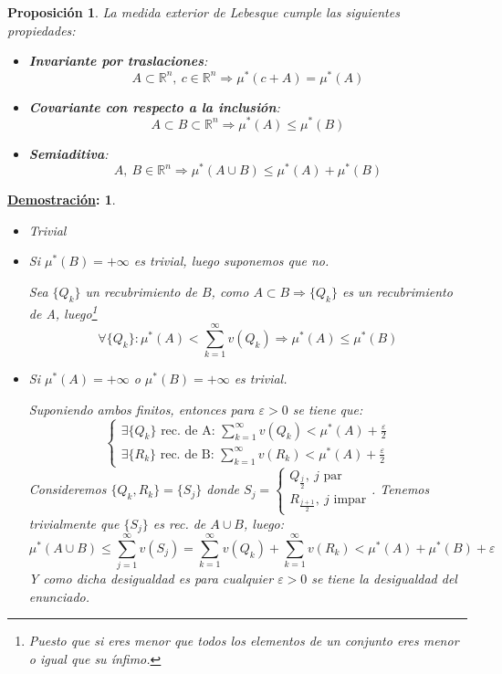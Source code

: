 \documentclass[10pt,a4paper,openright]{book}
\theoremstyle{break}
\newtheorem*{prop}{Proposición}
\newtheorem*{demo}{\underline{Demostración}:}
\begin{document}
\begin{prop}
La medida exterior de Lebesque cumple las siguientes propiedades:
\begin{itemize}
\item \textbf{Invariante por traslaciones}:
$$A \subset \mathbb{R}^{n}, \ c \in \mathbb{R}^{n} \Rightarrow \mu^{*}\left( c + A \right) = \mu^{*}\left( A \right) $$ 
\item \textbf{Covariante con respecto a la inclusión}:
$$A \subset B \subset \mathbb{R}^{n} \Rightarrow \mu^{*}\left( A \right) \le \mu^{*}\left( B \right) $$
\item \textbf{Semiaditiva}:
$$A,\ B \in \mathbb{R}^{n} \Rightarrow \mu^{*}\left( A \cup B \right) \le \mu^{*}\left( A \right) + \mu^{*}\left( B \right)$$
\end{itemize}
\end{prop}
\begin{demo}
\begin{itemize}
\item Trivial

\item Si $\mu^{*}\left( B \right) = +\infty$ es trivial, luego suponemos que no.

Sea $\{Q_k\}$ un recubrimiento de $B$, como $A \subset B \Rightarrow \{Q_k\}$ es un recubrimiento de A, luego\footnote{Puesto que si eres menor que todos los elementos de un conjunto eres menor o igual que su ínfimo.}
$$\forall \{Q_k\}: \mu^{*}\left( A \right) < \sum_{k=1}^{\infty} v\left( Q_k \right) \Rightarrow \mu^{*}\left( A \right) \le \mu^{*}\left( B \right) $$

\item Si $\mu^{*}\left( A \right) = +\infty$ o $\mu^{*}\left( B \right) = +\infty$ es trivial. 
 
Suponiendo ambos finitos, entonces para $\varepsilon > 0$ se tiene que:
$$\begin{cases}
\exists \{Q_k\} \text{ rec. de A: } \sum_{k=1}^{\infty} v\left( Q_k \right) < \mu^{*}\left( A \right) + \frac{\varepsilon}{2}  \\
\exists \{R_k\} \text{ rec. de B: } \sum_{k=1}^{\infty} v\left( R_k \right) < \mu^{*}\left( A \right) + \frac{\varepsilon}{2} 
\end{cases}
$$
Consideremos $ \{Q_k, R_k\} = \{S_j\}$ donde $S_j = \begin{cases}
Q_{\frac{j}{2}},\ j \text{ par} \\
R_{\frac{j+1}{2}},\ j \text{ impar} 
\end{cases}$. Tenemos trivialmente que $\{S_j\}$ es rec. de $A\cup B$, luego:
$$\mu^{*}\left( A\cup B \right) \le \sum_{j=1}^{\infty} v\left( S_j \right) = \sum_{k=1}^{\infty} v\left( Q_k \right) + \sum_{k=1}^{\infty} v\left( R_k \right) < \mu^{*}\left( A \right) + \mu^{*}\left( B \right) + \varepsilon$$
Y como dicha desigualdad es para cualquier $\varepsilon > 0$ se tiene la desigualdad del enunciado.
\end{itemize}
\end{demo}
\end{document}
